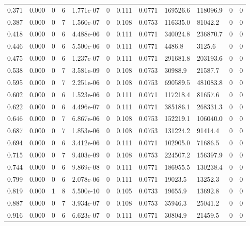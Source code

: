 \documentclass[preview]{standalone}
\begin{document}
{{\begin{tabular}{L{1.2cm}C{1.2cm} C{0.3cm}C{0.5cm} C{1.4cm}C{1.4cm} C{1.4cm}C{1.4cm} C{1.6cm}C{1.6cm} C{1.6cm}C{1.6cm}}
  0.371  &  0.000  & 0     &  6 &  1.771e-07  & 0  &  0.111&   0.0771& 169526.6 & 118096.9   &  0 & 0  \\ 
  0.387  &  0.000  & 0     &  7 &  1.560e-07  & 0  &  0.108&   0.0753& 116335.0 & 81042.2   &  0 & 0  \\ 
  0.418  &  0.000  & 0     &  6 &  4.488e-06  & 0  &  0.111&   0.0771& 340024.8 & 236870.7   &  0 & 0  \\ 
  0.446  &  0.000  & 0     &  6 &  5.500e-06  & 0  &  0.111&   0.0771& 4486.8 & 3125.6   &  0 & 0  \\ 
  0.475  &  0.000  & 0     &  6 &  1.237e-07  & 0  &  0.111&   0.0771& 291681.8 & 203193.6   &  0 & 0  \\ 
  0.538  &  0.000  & 0     &  7 &  3.581e-09  & 0  &  0.108&   0.0753& 30988.9 & 21587.7   &  0 & 0  \\ 
  0.595  &  0.000  & 0     &  7 &  2.251e-06  & 0  &  0.108&   0.0753& 690589.5 & 481083.8   &  0 & 0  \\ 
  0.602  &  0.000  & 0     &  6 &  1.523e-06  & 0  &  0.111&   0.0771& 117218.4 & 81657.6   &  0 & 0  \\ 
  0.622  &  0.000  & 0     &  6 &  4.496e-07  & 0  &  0.111&   0.0771& 385186.1 & 268331.3   &  0 & 0  \\ 
  0.646  &  0.000  & 0     &  7 &  6.867e-06  & 0  &  0.108&   0.0753& 152219.1 & 106040.0   &  0 & 0  \\ 
  0.687  &  0.000  & 0     &  7 &  1.853e-06  & 0  &  0.108&   0.0753& 131224.2 & 91414.4   &  0 & 0  \\ 
  0.694  &  0.000  & 0     &  6 &  3.412e-06  & 0  &  0.111&   0.0771& 102905.0 & 71686.5   &  0 & 0  \\ 
  0.715  &  0.000  & 0     &  7 &  9.403e-09  & 0  &  0.108&   0.0753& 224507.2 & 156397.9   &  0 & 0  \\ 
  0.744  &  0.000  & 0     &  6 &  9.869e-08  & 0  &  0.111&   0.0771& 186955.5 & 130238.4   &  0 & 0  \\ 
  0.799  &  0.000  & 0     &  6 &  2.078e-06  & 0  &  0.111&   0.0771& 19023.5 & 13252.3   &  0 & 0  \\ 
  0.819  &  0.000  & 1     &  8 &  5.500e-10  & 0  &  0.105&   0.0733& 19655.9 & 13692.8   &  0 & 0  \\ 
  0.887  &  0.000  & 0     &  7 &  3.934e-07  & 0  &  0.108&   0.0753& 35946.3 & 25041.2   &  0 & 0  \\ 
  0.916  &  0.000  & 0     &  6 &  6.623e-07  & 0  &  0.111&   0.0771& 30804.9 & 21459.5   &  0 & 0  \\ 

\end{tabular}}}
\end{document}
